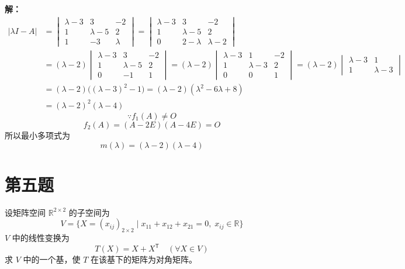 \documentclass{article}
\begin{document}
\textbf{解：}
\[
\begin{aligned}
|\lambda I - A|
&= \begin{vmatrix}
\lambda-3 & 3 & -2 \\
1 & \lambda-5 & 2 \\
1 & -3 & \lambda
\end{vmatrix}
= \begin{vmatrix}
\lambda-3 & 3 & -2 \\
1 & \lambda-5 & 2 \\
0 & 2-\lambda & \lambda-2
\end{vmatrix} \\
&= (\lambda-2) \begin{vmatrix}
\lambda-3 & 3 & -2 \\
1 & \lambda-5 & 2 \\
0 & -1 & 1
\end{vmatrix}
= (\lambda-2) \begin{vmatrix}
\lambda-3 & 1 & -2 \\
1 & \lambda-3 & 2 \\
0 & 0 & 1
\end{vmatrix}
= (\lambda-2) \begin{vmatrix}
\lambda-3 & 1 \\
1 & \lambda-3
\end{vmatrix} \\
&= (\lambda-2)\bigl((\lambda-3)^2-1\bigr) = (\lambda-2)(\lambda^2-6\lambda+8) \\
&= (\lambda-2)^2(\lambda-4)
\end{aligned}
\]
\[\because f_1(A) \ne O\]
\[f_2(A) = (A - 2E)(A-4E)=O\]
所以最小多项式为\[m(\lambda) = (\lambda-2)(\lambda-4)\]

\newpage
\section{第五题}\noindent
设矩阵空间 $\mathbb{R}^{2\times2}$ 的子空间为
\[
V = \{ X = (x_{ij})_{2\times2} \mid x_{11}+x_{12}+x_{21} = 0,\; x_{ij}\in \mathbb{R} \}
\]
$V$ 中的线性变换为
\[
T(X) = X + X^{\mathsf{T}} \quad (\forall X \in V)
\]
求 $V$ 中的一个基，使 $T$ 在该基下的矩阵为对角矩阵。
\end{document}
